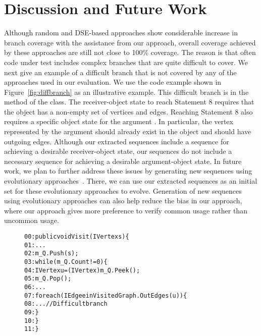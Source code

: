\section{Discussion and Future Work}
\label{sec:future}

Although random and DSE-based approaches show considerable increase in branch coverage with the assistance from our approach, overall coverage achieved by these approaches are still not close to 100\% coverage. The reason is that often code under test includes complex branches that are quite difficult to cover. We next give an example of a difficult branch that is not covered by any of the approaches used in our evaluation. We use the code example shown in Figure~\ref{fig:diffbranch} as an illustrative example. This difficult branch is in the  method of the  class. The receiver-object state to reach Statement 8 requires that the  object has a non-empty set of vertices and edges. Reaching Statement 8 also requires a specific object state for the argument . In particular, the vertex represented by the argument  should already exist in the  object and should have outgoing edges. Although our extracted sequences include a sequence for achieving a desirable receiver-object state, our sequences do not include a necessary sequence for achieving a desirable argument-object state. In future work, we plan to further address these issues by generating new sequences using evolutionary approaches~\cite{tonella:etoc,  inkumsah08:improving}. There, we can use our extracted sequences as an initial set for these evolutionary approaches to evolve. Generation of new sequences using evolutionary approaches can also help reduce the bias in our approach, where our approach gives more preference to verify common usage rather than uncommon usage.

\begin{figure}[t]
\begin{CodeOut}
\begin{alltt}
00:public void Visit(IVertex s) \{
01:\hspace*{0.1in}...
02:\hspace*{0.1in}m\_Q.Push(s);
03:\hspace*{0.1in}while (m\_Q.Count != 0) \{
04:\hspace*{0.2in}IVertex u = (IVertex)m\_Q.Peek(); 
05:\hspace*{0.2in}m\_Q.Pop();
06:\hspace*{0.2in}...
07:\hspace*{0.2in}foreach(IEdge e in VisitedGraph.OutEdges(u)) \{ 
08:\hspace*{0.3in}...		//Difficult branch
09:\hspace*{0.2in}\} 
10:\hspace*{0.1in}\}
11:\}
\end{alltt}
\end{CodeOut}\vspace*{-5ex}
\vspace*{-5ex}
\end{figure}


